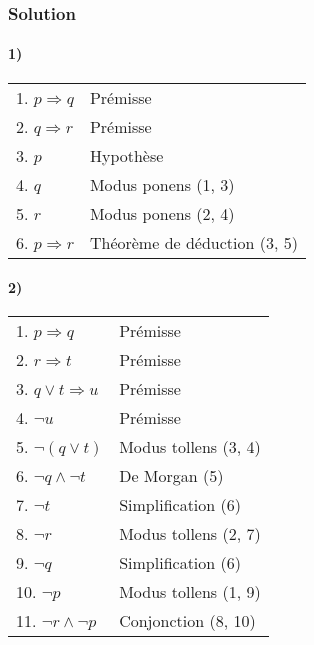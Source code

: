     \subsubsection{Solution}
    
    \paragraph{1)}
    \begin{center}
    \begin{tabular}{|l|l|}
    \hline
    1. $p \Rightarrow q$ & Prémisse \\
    2. $q \Rightarrow r$ & Prémisse \\
    \hspace{0.5cm} 3. $p$ & Hypothèse \\
    \hspace{0.5cm} 4. $q$ & Modus ponens (1, 3) \\
    \hspace{0.5cm} 5. $r$ & Modus ponens (2, 4) \\ 
    6. $p \Rightarrow r$ & Théorème de déduction (3, 5) \\
    \hline
    \end{tabular}
    \end{center}
    
    \paragraph{2)}
    \begin{center}
    \begin{tabular}{|l|l|}
    \hline
    1. $p \Rightarrow q$ & Prémisse \\
    2. $r \Rightarrow t$ & Prémisse \\
    3. $q \lor t \Rightarrow u $ & Prémisse \\
    4. $\lnot u$ & Prémisse \\
    5. $\lnot (q \lor t)$ & Modus tollens (3, 4) \\ 
    6. $\lnot q \land \lnot t$ & De Morgan (5) \\
    7. $\lnot t$ & Simplification (6) \\
    8. $\lnot r$ & Modus tollens (2, 7) \\
    9. $\lnot q$ & Simplification (6) \\
    10. $\lnot p$ & Modus tollens (1, 9) \\
    11. $\lnot r \land \lnot p$ & Conjonction (8, 10) \\
    \hline
    \end{tabular}
    \end{center}
    
